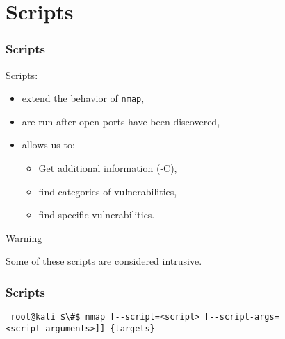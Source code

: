 \documentclass[aspectratio=169,xcolor=dvipsnames]{beamer}
\begin{document}
\section{Scripts}

\begin{frame}[fragile]
    \frametitle{Scripts}

    Scripts:

    \begin{itemize}
        \item extend the behavior of \texttt{nmap},
        \item are run after open ports have been discovered,
        \item allows us to:
        \begin{itemize}
            \item Get additional information (-C),
            \item find categories of vulnerabilities,
            \item find specific vulnerabilities.
        \end{itemize}
    \end{itemize}

    \pause

    \begin{alertblock}{Warning}
        \begin{center}
            Some of these scripts are considered intrusive.
        \end{center}
    \end{alertblock}

\end{frame}

\begin{frame}[fragile]
    \frametitle{Scripts}

    \begin{lstlisting}
 root@kali $\#$ nmap [--script=<script> [--script-args=<script_arguments>]] {targets}
    \end{lstlisting}

\end{frame}
\end{document}
